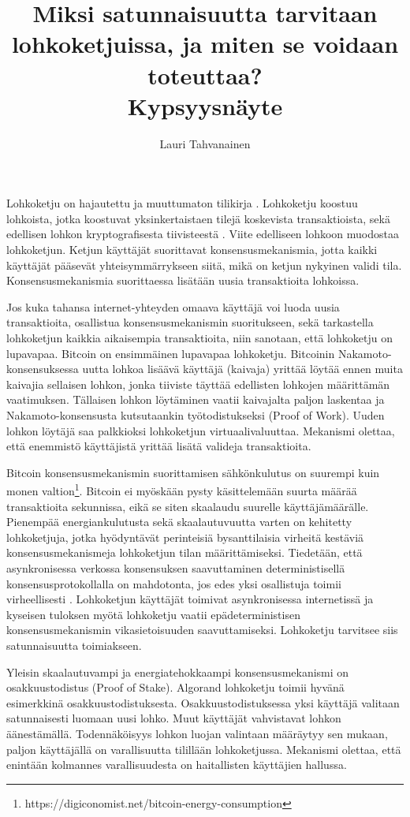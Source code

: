 \documentclass{article}
\title{ Miksi satunnaisuutta tarvitaan lohkoketjuissa, ja miten se voidaan
toteuttaa? \\\small{Kypsyysnäyte}}
\author{Lauri Tahvanainen}
\begin{document}
\maketitle

Lohkoketju on hajautettu ja muuttumaton tilikirja \cite{8760539}. Lohkoketju koostuu lohkoista, jotka koostuvat yksinkertaistaen tilejä koskevista transaktioista, sekä edellisen lohkon kryptografisesta tiivisteestä \cite{cryptoeprint:2011:565}. Viite edelliseen lohkoon muodostaa lohkoketjun. Ketjun käyttäjät suorittavat konsensusmekanismia, jotta kaikki käyttäjät pääsevät yhteisymmärrykseen siitä, mikä on ketjun nykyinen validi tila. Konsensusmekanismia suorittaessa lisätään uusia transaktioita lohkoissa. 

Jos kuka tahansa internet-yhteyden omaava käyttäjä voi luoda uusia transaktioita, osallistua konsensusmekanismin suoritukseen, sekä tarkastella lohkoketjun kaikkia aikaisempia transaktioita, niin sanotaan, että lohkoketju on lupavapaa. Bitcoin \cite{Nakamoto_bitcoin} on ensimmäinen lupavapaa lohkoketju. Bitcoinin Nakamoto-konsensuksessa uutta lohkoa lisäävä käyttäjä (kaivaja) yrittää löytää ennen muita kaivajia sellaisen lohkon, jonka tiiviste täyttää edellisten lohkojen määrittämän vaatimuksen. Tällaisen lohkon löytäminen vaatii kaivajalta paljon laskentaa ja Nakamoto-konsensusta kutsutaankin työtodistukseksi (Proof of Work). Uuden lohkon löytäjä saa palkkioksi lohkoketjun virtuaalivaluuttaa. Mekanismi olettaa, että enemmistö käyttäjistä yrittää lisätä valideja transaktioita.

Bitcoin konsensusmekanismin suorittamisen sähkönkulutus on suurempi kuin monen valtion\footnote{https://digiconomist.net/bitcoin-energy-consumption}. Bitcoin ei myöskään pysty käsittelemään suurta määrää transaktioita sekunnissa, eikä se siten skaalaudu suurelle käyttäjämäärälle. Pienempää energiankulutusta sekä skaalautuvuutta varten on kehitetty lohkoketjuja, jotka hyödyntävät perinteisiä bysanttilaisia virheitä kestäviä konsensusmekanismeja lohkoketjun tilan määrittämiseksi. Tiedetään, että asynkronisessa verkossa konsensuksen saavuttaminen deterministisellä konsensusprotokollalla on mahdotonta, jos edes yksi osallistuja toimii virheellisesti \cite{fischer_impossibility_1985}. Lohkoketjun käyttäjät toimivat asynkronisessa internetissä ja kyseisen tuloksen myötä lohkoketju vaatii epädeterministisen konsensusmekanismin vikasietoisuuden saavuttamiseksi. Lohkoketju tarvitsee siis satunnaisuutta toimiakseen. 

Yleisin skaalautuvampi ja energiatehokkaampi konsensusmekanismi on osakkuustodistus (Proof of Stake). Algorand \cite{gilad_algorand_2017} lohkoketju toimii hyvänä esimerkkinä osakkuustodistuksesta. Osakkuustodistuksessa yksi käyttäjä valitaan satunnaisesti luomaan uusi lohko. Muut käyttäjät vahvistavat lohkon äänestämällä. Todennäköisyys lohkon luojan valintaan määräytyy sen mukaan, paljon käyttäjällä on varallisuutta tilillään lohkoketjussa. Mekanismi olettaa, että enintään kolmannes varallisuudesta on haitallisten käyttäjien hallussa.
\end{document}
